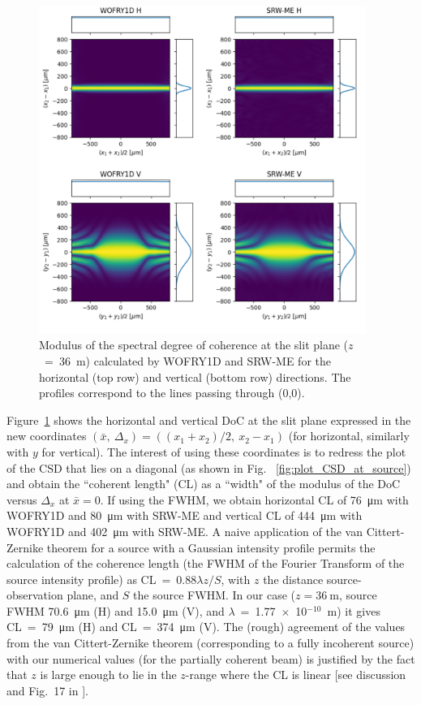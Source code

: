 \documentclass{iucr}
\newcommand{\inblue}[1]{{\color{blue}#1}}
\begin{document}
\begin{figure}
    \label{fig:plot_DoC_at_36m}
    \includegraphics[width=0.95\textwidth]{figures/plot_DoC_at_36m.pdf}
    \caption{Modulus of the spectral degree of coherence at the slit plane ($z$~=~\SI{36}{\meter}) calculated by WOFRY1D and SRW-ME for the horizontal (top row) and vertical (bottom row) directions.
    The profiles correspond to the lines passing through (0,0).
    }
\end{figure}

\inblue{Figure~\ref{fig:plot_DoC_at_36m}} shows the horizontal and vertical DoC at the slit plane expressed in the new coordinates $(\bar{x},~\Delta_x) = ((x_1+x_2)\big/2,~x_2-x_1)$ (for horizontal, similarly with $y$ for vertical). The interest of using these coordinates is to redress the plot of the CSD that lies on a diagonal (as shown in \inblue{Fig. ~\ref{fig:plot_CSD_at_source}}) and obtain the ``coherent length" (CL) as a ``width" of the modulus of the DoC versus $\Delta_x$ at $\bar{x}=0$. If using the FWHM, we obtain horizontal CL of \SI{76}{\micro\meter} with WOFRY1D and \SI{80}{\micro\meter} with SRW-ME and vertical CL of
\SI{444}{\micro\meter} with WOFRY1D and \SI{402}{\micro\meter} with SRW-ME. A naive application of the van Cittert-Zernike theorem for a source with a Gaussian intensity profile permits the calculation of the coherence length (the FWHM of the Fourier Transform of the source intensity profile) as CL~=~0.88$\lambda z/S$, with $z$ the distance source-observation plane, and $S$ the source FWHM. In our case ($z=\SI{36}{\meter}$, source FWHM \SI{70.6}{\micro\meter} (H) and \SI{15.0}{\micro\meter} (V), and $\lambda$~=~1.77~$\times$~10$^{-10}$~m) it gives CL~=~\SI{79}{\micro\meter} (H) and CL~=~\SI{374}{\micro\meter} (V). The (rough) agreement of the values from the van Cittert-Zernike theorem (corresponding to a fully incoherent source) with our numerical values (for the partially coherent beam) is justified by the fact that $z$ is large enough to lie in the $z$-range where the CL is linear [see discussion and Fig.~17 in \cite{geloni2008}].
\end{document}
